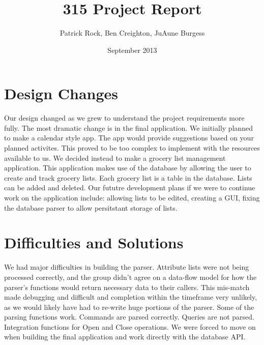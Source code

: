 \documentclass{article}
\title{315 Project Report}
\author{Patrick Rock, Ben Creighton, JuAune Burgess}
\date{September 2013}
\begin{document}
\maketitle

\section{Design Changes}
Our design changed as we grew to understand the project requirements more fully. The most dramatic change 
is in the final application. We initially planned to make a calendar style app. The app would provide suggestions
based on your planned activites. This proved to be too complex to implement with the resources available to us. 
We decided instead to make a grocery list management application. This application makes use of the database by 
allowing the user to create and track grocery lists. Each grocery list is a table in the database. Lists can 
be added and deleted. Our fututre development plans if we were to continue work on the application include:
allowing lists to be edited, creating a GUI, fixing the database parser to allow persitstant storage of lists. 

\section{Difficulties and Solutions}
We had major difficulties in building the parser.
Attribute lists were not being processed correctly, and the group didn’t agree on a data-flow model for how the
parser's functions would return necessary data to their callers. This mis-match made debugging and difficult and
completion within the timeframe very unlikely, as we would likely have had to re-write huge portions of the parser.
Some of the parsing functions work. Commands are parsed correctly. Queries are not parsed. Integration functions
for Open and Close operations. We were forced to move on when building the final application and work directly with
the database API. 
\end{document}
